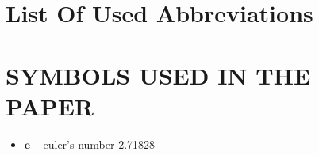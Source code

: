 
\tableofcontents
\newpage

\section*{\centering List Of Used Abbreviations}
\begin{adjustwidth}{113pt}{43pt}
	\begin{sortedlist}
	\end{sortedlist}
\end{adjustwidth}
\section*{SYMBOLS USED IN THE PAPER}
\begin{center}
	\begin{minipage}[c]{0.5\linewidth}
		\begin{itemize}[label={}]
			\item $ \mathbf{e} $ -- euler's number 2.71828
		\end{itemize}
	\end{minipage}
\end{center}
